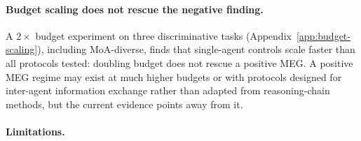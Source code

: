 \documentclass{article}
\begin{document}
\paragraph{Budget scaling does not rescue the negative finding.}
A $2{\times}$ budget experiment on three discriminative tasks (Appendix~\ref{app:budget-scaling}), including MoA-diverse, finds that single-agent controls scale faster than all protocols tested: doubling budget does not rescue a positive MEG. A positive MEG regime may exist at much higher budgets or with protocols designed for inter-agent information exchange rather than adapted from reasoning-chain methods, but the current evidence points away from it.

\paragraph{Limitations.}
\end{document}
